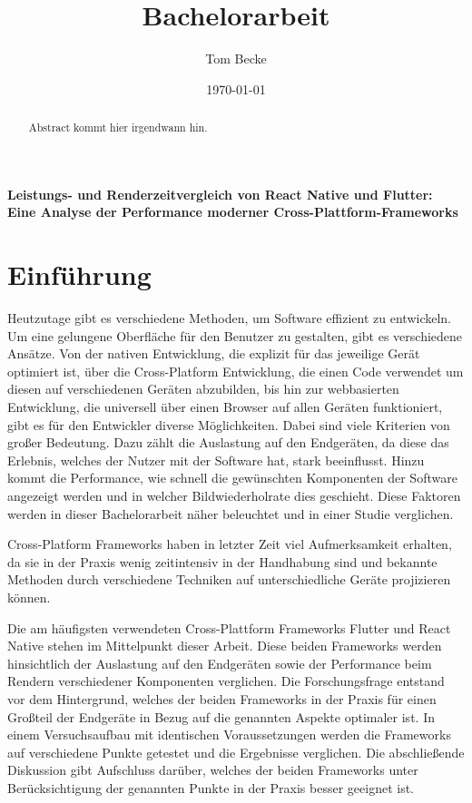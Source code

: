 \documentclass[a4paper,12pt]{article}
\title{Bachelorarbeit}
\author{Tom Becke}
\date{\today}
\begin{document}
\doublespacing

\maketitle

\begin{center}
    {\LARGE \textbf{Leistungs- und Renderzeitvergleich von React Native und Flutter: Eine Analyse der Performance moderner Cross-Plattform-Frameworks}}
\end{center}

\begin{abstract}
    Abstract kommt hier irgendwann hin.
\end{abstract}

\newpage

\tableofcontents

\newpage

\section{Einführung}
Heutzutage gibt es verschiedene Methoden, um Software effizient zu entwickeln. Um eine gelungene Oberfläche für den Benutzer zu gestalten, gibt es verschiedene Ansätze. Von der nativen Entwicklung, die explizit für das jeweilige Gerät optimiert ist, über die Cross-Platform Entwicklung, die einen Code verwendet um diesen auf verschiedenen Geräten abzubilden, bis hin zur webbasierten Entwicklung, die universell über einen Browser auf allen Geräten funktioniert, gibt es für den Entwickler diverse Möglichkeiten. Dabei sind viele Kriterien von großer Bedeutung. Dazu zählt die Auslastung auf den Endgeräten, da diese das Erlebnis, welches der Nutzer mit der Software hat, stark beeinflusst. Hinzu kommt die Performance, wie schnell die gewünschten Komponenten der Software angezeigt werden und in welcher Bildwiederholrate dies geschieht. Diese Faktoren werden in dieser Bachelorarbeit näher beleuchtet und in einer Studie verglichen.

Cross-Platform Frameworks haben in letzter Zeit viel Aufmerksamkeit erhalten, da sie in der Praxis wenig zeitintensiv in der Handhabung sind und bekannte Methoden durch verschiedene Techniken auf unterschiedliche Geräte projizieren können.

Die am häufigsten verwendeten Cross-Plattform Frameworks Flutter und React Native stehen im Mittelpunkt dieser Arbeit. Diese beiden Frameworks werden hinsichtlich der Auslastung auf den Endgeräten sowie der Performance beim Rendern verschiedener Komponenten verglichen. Die Forschungsfrage entstand vor dem Hintergrund, welches der beiden Frameworks in der Praxis für einen Großteil der Endgeräte in Bezug auf die genannten Aspekte optimaler ist. In einem Versuchsaufbau mit identischen Voraussetzungen werden die Frameworks auf verschiedene Punkte getestet und die Ergebnisse verglichen. Die abschließende Diskussion gibt Aufschluss darüber, welches der beiden Frameworks unter Berücksichtigung der genannten Punkte in der Praxis besser geeignet ist.
\end{document}
